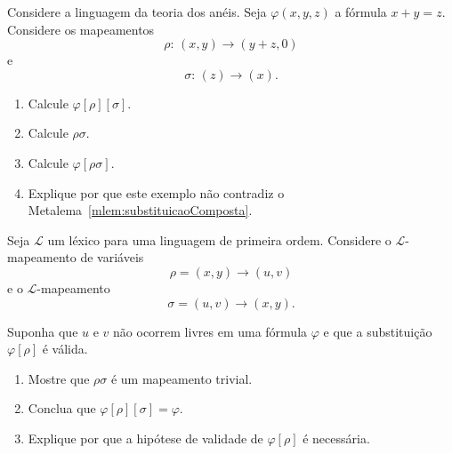 \begin{exercise}\label{exr:substituicaoCompostaExemplo}
    Considere a linguagem da teoria dos anéis.
    Seja $\varphi(x,y,z)$ a fórmula $x+y=z$.
    Considere os mapeamentos
    \[
        \rho:\,(x,y)\to(y+z,0)
    \]
    e
    \[
        \sigma:\,(z)\to(x).
    \]

    \begin{enumerate}[label=(\alph*)]
        \item Calcule $\varphi[\rho][\sigma]$.
        \item Calcule $\rho\sigma$.
        \item Calcule $\varphi[\rho\sigma]$.
        \item Explique por que este exemplo não contradiz o Metalema~\ref{mlem:substituicaoComposta}.
    \end{enumerate}
\end{exercise}

\begin{exercise}\label{exr:substituicaoInversa}
    Seja $\mathcal L$ um léxico para uma linguagem de primeira ordem.
    Considere o $\mathcal L$-mapeamento de variáveis
    \[
        \rho=(x,y)\to(u,v)
    \]
    e o $\mathcal L$-mapeamento
    \[
        \sigma=(u,v)\to(x,y).
    \]

    Suponha que $u$ e $v$ não ocorrem livres em uma fórmula $\varphi$ e que a substituição $\varphi[\rho]$ é válida.

    \begin{enumerate}[label=(\alph*)]
        \item Mostre que $\rho\sigma$ é um mapeamento trivial.
        \item Conclua que $\varphi[\rho][\sigma]=\varphi$.
        \item Explique por que a hipótese de validade de $\varphi[\rho]$ é necessária.
    \end{enumerate}
\end{exercise}